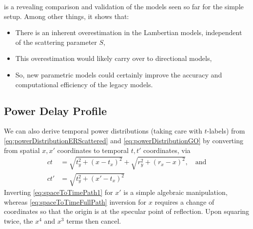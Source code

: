 \documentclass{article}
\begin{document}
\newpage
{} is a revealing comparison and validation of the
models seen so far for the simple setup. Among other things, it shows that:
\begin{itemize}
   \item There is an inherent overestimation in the Lambertian models, independent of
      the scattering parameter $S$,
   \item This overestimation would likely carry over to directional models, 
   \item So, new parametric models could certainly improve the accuracy and 
      computational efficiency of the legacy models.
\end{itemize}
\subsection{Power Delay Profile}
We can also derive temporal power distributions (taking care with $t$-labels) from
\eqref{eq:powerDistributionERScattered} and \eqref{eq:powerDistributionGO} by
converting from spatial $x, x'$ coordinates to temporal $t, t'$ coordinates, via 
\begin{align}
   ct &= \sqrt{t_y^2 + (x - t_x)^2} + \sqrt{r_y^2 + (r_x - x)^2}, \quad \text{and}
      \label{eq:spaceToTimeFullPath} \\
   ct' &= \sqrt{t_y^2 + (x' - t_x)^2} \label{eq:spaceToTimePath1}
\end{align}
Inverting \eqref{eq:spaceToTimePath1} for $x'$ is a simple algebraic manipulation,
whereas \eqref{eq:spaceToTimeFullPath} inversion for $x$ requires a change of
coordinates so that the origin is at the specular point of reflection. Upon squaring
twice, the $x^4$ and $x^3$ terms then cancel.
\end{document}
